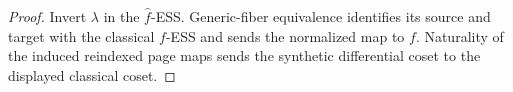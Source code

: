 \begin{proof}
  Invert $\lambda$ in the $\widehat f$-ESS.  Generic-fiber equivalence
  identifies its source and target with the classical $f$-ESS and sends the
  normalized map to $f$.  Naturality of the induced reindexed page maps sends
  the synthetic differential coset to the displayed classical coset.
\end{proof}
